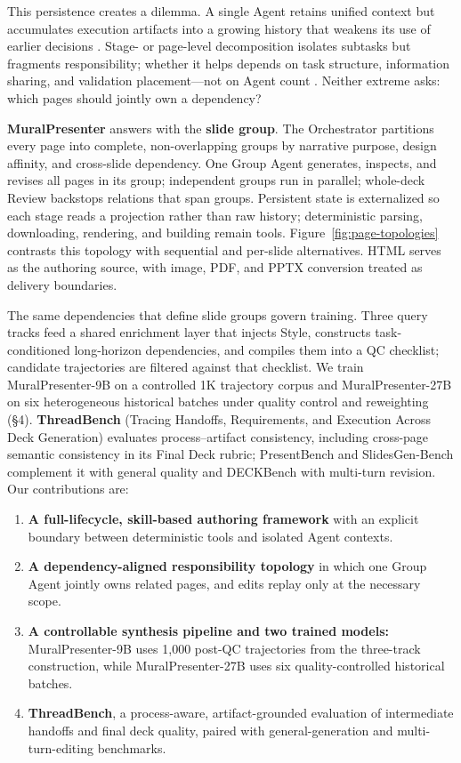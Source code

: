 This persistence creates a dilemma. A single Agent retains unified context but accumulates execution artifacts into a growing history that weakens its use of earlier decisions \citep{sun2025contextfolding}. Stage- or page-level decomposition isolates subtasks but fragments responsibility; whether it helps depends on task structure, information sharing, and validation placement—not on Agent count \citep{kim2025scalingagents}. Neither extreme asks: which pages should jointly own a dependency?

\textbf{MuralPresenter} answers with the \textbf{slide group}. The Orchestrator partitions every page into complete, non-overlapping groups by narrative purpose, design affinity, and cross-slide dependency. One Group Agent generates, inspects, and revises all pages in its group; independent groups run in parallel; whole-deck Review backstops relations that span groups. Persistent state is externalized so each stage reads a projection rather than raw history; deterministic parsing, downloading, rendering, and building remain tools. Figure~\ref{fig:page-topologies} contrasts this topology with sequential and per-slide alternatives. HTML serves as the authoring source, with image, PDF, and PPTX conversion treated as delivery boundaries.



The same dependencies that define slide groups govern training. Three query tracks feed a shared enrichment layer that injects Style, constructs task-conditioned long-horizon dependencies, and compiles them into a QC checklist; candidate trajectories are filtered against that checklist. We train MuralPresenter-9B on a controlled 1K trajectory corpus and MuralPresenter-27B on six heterogeneous historical batches under quality control and reweighting (§4). \textbf{ThreadBench} (Tracing Handoffs, Requirements, and Execution Across Deck Generation) evaluates process--artifact consistency, including cross-page semantic consistency in its Final Deck rubric; PresentBench and SlidesGen-Bench complement it with general quality and DECKBench with multi-turn revision. Our contributions are:

\begin{enumerate}
\item \textbf{A full-lifecycle, skill-based authoring framework} with an explicit boundary between deterministic tools and isolated Agent contexts.
\item \textbf{A dependency-aligned responsibility topology} in which one Group Agent jointly owns related pages, and edits replay only at the necessary scope.
\item \textbf{A controllable synthesis pipeline and two trained models:} MuralPresenter-9B uses 1,000 post-QC trajectories from the three-track construction, while MuralPresenter-27B uses six quality-controlled historical batches.
\item \textbf{ThreadBench}, a process-aware, artifact-grounded evaluation of intermediate handoffs and final deck quality, paired with general-generation and multi-turn-editing benchmarks.
\end{enumerate}


